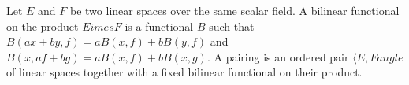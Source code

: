 Let $E$ and $F$ be two linear spaces over the same scalar field. A bilinear functional on the product $E 	imes F$ is a functional $B$ such that $B(ax + by, f) = aB(x,f) + bB(y,f)$ and $B(x, af + bg) = aB(x,f) + bB(x,g)$. A pairing is an ordered pair $\langle E,F 
angle$ of linear spaces together with a fixed bilinear functional on their product.

